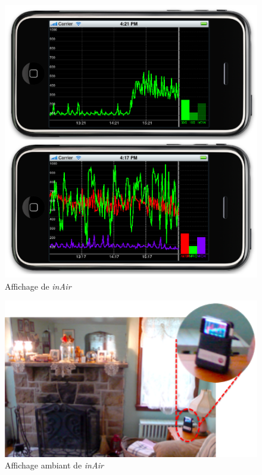 \documentclass[10pt,a5paper,twoside]{article}
\begin{document}
\begin{figure}
\centering
\includegraphics[]{images/inair-screenshot2.png}
\caption{Affichage de \emph{inAir}}\label{fig:inair2}
\end{figure}

\begin{figure}
\centering
\includegraphics[]{images/inair-screenshot1.png}
\caption{Affichage ambiant de \emph{inAir}}\label{fig:inair3}
\end{figure}
\end{document}
